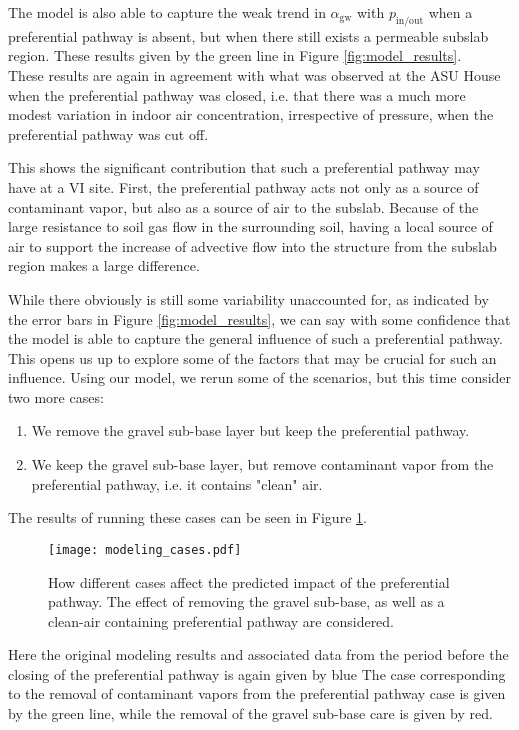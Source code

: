 The model is also able to capture the weak trend in $\alpha_\mathrm{gw}$ with $p_\mathrm{in/out}$ when a preferential pathway is absent, but when there still exists a permeable subslab region.
These results given by the green line in Figure \ref{fig:model_results}.  
These results are again in agreement with what was observed at the ASU House when the preferential pathway was closed, i.e. that there was a much more modest variation in indoor air concentration, irrespective of pressure, when the preferential pathway was cut off.\par

This shows the significant contribution that such a preferential pathway may have at a VI site.
First, the preferential pathway acts not only as a source of contaminant vapor, but also  as a source of air to the subslab.
Because of the large resistance to soil gas flow in the surrounding soil, having a local source of air to support the increase of advective flow into the structure from the subslab region makes a large difference.\par

While there obviously is still some variability unaccounted for, as indicated by the error bars in Figure \ref{fig:model_results}, we can say with some confidence that the model is able to capture the general influence of such a preferential pathway.
This opens us up to explore some of the factors that may be crucial for such an influence.
Using our model, we rerun some of the scenarios, but this time consider two more cases:
\begin{enumerate}
  \item We remove the gravel sub-base layer but keep the preferential pathway.
  \item We keep the gravel sub-base layer, but remove contaminant vapor from the preferential pathway, i.e. it contains "clean" air.
\end{enumerate}
The results of running these cases can be seen in Figure \ref{fig:model_cases}.\par

\begin{figure}[htb!]
  \centering
  \texttt{[image: modeling\_cases.pdf]}
  \caption{How different cases affect the predicted impact of the preferential pathway. The effect of removing the gravel sub-base, as well as a clean-air containing preferential pathway are considered.}
  \label{fig:model_cases}
\end{figure}

Here the original modeling results and associated data from the period before the closing of the preferential pathway is again given by blue
The case corresponding to the removal of contaminant vapors from the preferential pathway case is given by the green line, while the removal of the gravel sub-base care is given by red.\par

